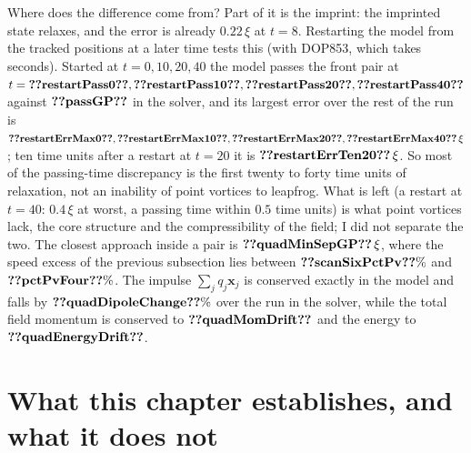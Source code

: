 Where does the difference come from? Part of it is the imprint: the imprinted state relaxes, and the error is already $0.22\,\xi$ at $t=8$. Restarting the model from the tracked positions at a later time tests this (with DOP853, which takes seconds). Started at $t=0,10,20,40$ the model passes the front pair at $t=\cthreeNum{restartPass0},\cthreeNum{restartPass10},\cthreeNum{restartPass20},\cthreeNum{restartPass40}$ against $\cthreeNum{passGP}$ in the solver, and its largest error over the rest of the run is $\cthreeNum{restartErrMax0},\cthreeNum{restartErrMax10},\cthreeNum{restartErrMax20},\cthreeNum{restartErrMax40}\,\xi$; ten time units after a restart at $t=20$ it is $\cthreeNum{restartErrTen20}\,\xi$. So most of the passing-time discrepancy is the first twenty to forty time units of relaxation, not an inability of point vortices to leapfrog. What is left (a restart at $t=40$: $0.4\,\xi$ at worst, a passing time within $0.5$ time units) is what point vortices lack, the core structure and the compressibility of the field; I did not separate the two. The closest approach inside a pair is $\cthreeNum{quadMinSepGP}\,\xi$, where the speed excess of the previous subsection lies between $\cthreeNum{scanSixPctPv}\%$ and $\cthreeNum{pctPvFour}\%$. The impulse $\sum_jq_j\mathbf x_j$ is conserved exactly in the model and falls by $\cthreeNum{quadDipoleChange}\%$ over the run in the solver, while the total field momentum is conserved to $\cthreeNum{quadMomDrift}$ and the energy to $\cthreeNum{quadEnergyDrift}$.

\section{What this chapter establishes, and what it does not}\label{ch03:honest}

